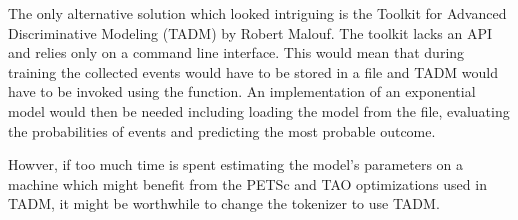The only alternative solution which looked intriguing is the Toolkit for
Advanced Discriminative Modeling (TADM) by Robert Malouf. The toolkit lacks an
API and relies only on a command line interface. This would mean that during
training the collected events would have to be stored in a file and TADM would
have to be invoked using the  function. An implementation of
an exponential model would then be needed including loading the model from the
file, evaluating the probabilities of events and predicting the most probable
outcome.

Howver, if too much time is spent estimating the model's parameters on a
machine which might benefit from the PETSc and TAO optimizations used in TADM,
it might be worthwhile to change the tokenizer to use TADM.
